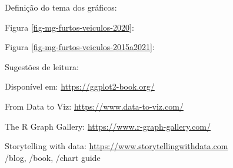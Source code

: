 \begin{frame}
\framebreak
Definição do tema dos gráficos:


\framebreak
Figura \ref{fig-mg-furtos-veiculos-2020}:


\framebreak
Figura \ref{fig-mg-furtos-veiculos-2015a2021}:


\end{frame}




\begin{frame}
Sugestões de leitura: 
\vspace{2ex}

Disponível em: \url{https://ggplot2-book.org/}

\vspace{3ex}

\vspace{3ex}
From Data to Viz: \url{https://www.data-to-viz.com/}

\vspace{3ex}
The R Graph Gallery: \url{https://www.r-graph-gallery.com/}

\vspace{3ex}
Storytelling with data: \url{https://www.storytellingwithdata.com}\\
/blog, /book, /chart guide

\end{frame}
